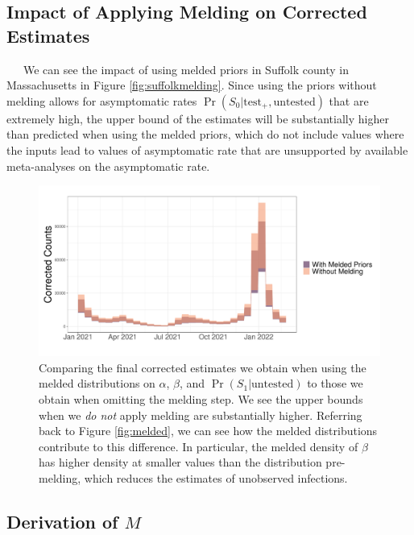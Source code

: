 \documentclass[12pt,twoside]{smiththesis}
\begin{document}
\hypertarget{impact-of-applying-melding-on-corrected-estimates}{%
\subsection{Impact of Applying Melding on Corrected Estimates}\label{impact-of-applying-melding-on-corrected-estimates}}

~~~We can see the impact of using melded priors in Suffolk county in Massachusetts in Figure \ref{fig:suffolkmelding}. Since using the priors without melding allows for asymptomatic rates \(\Pr(S_0|\text{test}_+,\text{untested})\) that are extremely high, the upper bound of the estimates will be substantially higher than predicted when using the melded priors, which do not include values where the inputs lead to values of asymptomatic rate that are unsupported by available meta-analyses on the asymptomatic rate.
\begin{figure}

{\centering \includegraphics[width=1\linewidth]{figure/suffolk_bayesian_melding} 

}

\caption{\label{fig:suffolkmelding}Comparing the final corrected estimates we obtain when using the melded distributions on $\alpha$, $\beta$, and $\Pr(S_1|\text{untested})$ to those we obtain when omitting the melding step. We see the upper bounds when we \emph{do not} apply melding are substantially higher. Referring back to Figure \ref{fig:melded}, we can see how the melded distributions contribute to this difference. In particular, the melded density of $\beta$ has higher density at smaller values than the distribution pre-melding, which reduces the estimates of unobserved infections.}\label{fig:unnamed-chunk-21}
\end{figure}
\hypertarget{derivation}{%
\subsection{\texorpdfstring{Derivation of \(M\)}{Derivation of M}}\label{derivation}}
\end{document}
